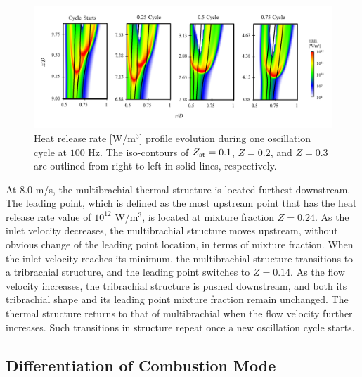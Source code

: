 \begin{figure}[t]
  \centering
  \scriptsize
  \includegraphics[trim=6.5mm 7.5mm 7mm 8mm, clip=true, width=1.0\textwidth]{ch-dynamics/HRR_100Hz.png}
  \normalsize
  \caption{Heat release rate [W/m$^3$] profile evolution during one oscillation cycle at $100$ Hz.  The iso-contours of $Z_{\rm st} = 0.1$, $Z = 0.2$, and $Z = 0.3$ are outlined from right to left in solid lines, respectively.}
  \label{fig:HRR_100Hz}
\end{figure}

At $8.0$ m/s, the multibrachial thermal structure is located furthest downstream.  The leading point, which is defined as the most upstream point that has the heat release rate value of $10^{12}$ W/m$^3$, is located at mixture fraction $Z = 0.24$.  As the inlet velocity decreases, the multibrachial structure moves upstream, without obvious change of the leading point location, in terms of mixture fraction.  When the inlet velocity reaches its minimum, the multibrachial structure transitions to a tribrachial structure, and the leading point switches to $Z = 0.14$.  As the flow velocity increases, the tribrachial structure is pushed downstream, and both its tribrachial shape and its leading point mixture fraction remain unchanged.  The thermal structure returns to that of multibrachial when the flow velocity further increases.  Such transitions in structure repeat once a new oscillation cycle starts.

\subsection{Differentiation of Combustion Mode}

